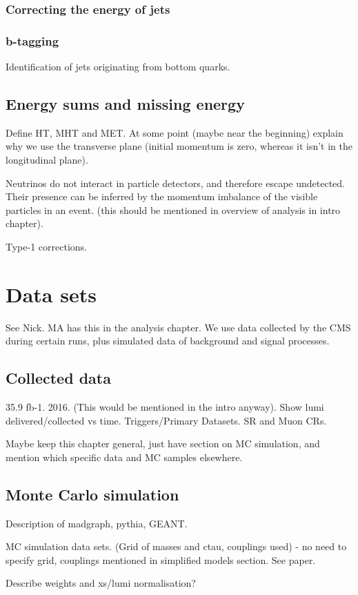 \subsubsection{Correcting the energy of jets}

\subsubsection{b-tagging}
Identification of jets originating from bottom quarks.

\subsection{Energy sums and missing energy}

Define HT, MHT and MET. At some point (maybe near the beginning) explain why we 
use  the transverse plane (initial momentum is zero, whereas it isn't in the 
longitudinal plane).

Neutrinos do not interact in particle detectors, and therefore escape 
undetected. Their presence can be inferred by the momentum imbalance of the 
visible particles in an event. (this should be mentioned in overview of 
analysis in intro chapter).

Type-1 corrections.

\section{Data sets}

See Nick. MA has this in the analysis chapter.
We use data collected by the CMS during certain runs, plus simulated data of 
background and signal processes.

\subsection{Collected data}

35.9 fb-1. 2016. (This would be mentioned in the intro anyway).
Show lumi delivered/collected vs time.
Triggers/Primary Datasets.
SR and Muon CRs.

Maybe keep this chapter general, just have section on MC simulation, and 
mention which specific data and MC samples elsewhere.

\subsection{Monte Carlo simulation}

Description of madgraph, pythia, GEANT.

MC simulation data sets.
(Grid of masses and ctau, couplings used) - no need to specify grid, couplings 
mentioned in simplified models section.
See paper.

Describe weights and xs/lumi normalisation?